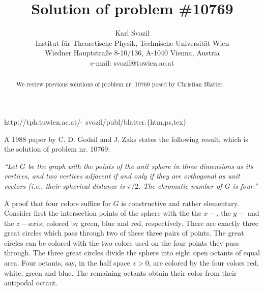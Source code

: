 

\def\frak{\cal }
\def\Bbb{\bf }

\title{Solution of problem \#10769}
\author{Karl Svozil\\
 {\small Institut f\"ur Theoretische Physik,}
  {\small Technische Universit\"at Wien }     \\
  {\small Wiedner Hauptstra\ss e 8-10/136,}
  {\small A-1040 Vienna, Austria   }            \\
  {\small e-mail: svozil@tuwien.ac.at}}
\date{ }
\maketitle

\begin{flushright}
{\scriptsize
http://tph.tuwien.ac.at/$\widetilde{\;\;}\,$svozil/publ/blatter.$\{$htm,ps,tex$\}$}
\end{flushright}

\begin{abstract}
We review previous solutions of problem nr. 10769 posed by Christian Blatter
\end{abstract}

A 1988 paper by C. D. Godsil and J. Zaks \cite{godsil-zaks} states the following result, which is
the solution of problem nr. 10769:

{\em ``Let $G$ be the graph with the points of the unit sphere in three dimensions
as its vertices, and two vertices adjacent if and only if they are orthogonal as unit vectors
(i.e., their spherical distance is $\pi /2$.
The chromatic number of $G$ is four.''}

A proof that four colors suffice for $G$ is constructive and rather elementary.
Consider first the intersection points of the
sphere with the the $x-$, the $y-$ and the $z-axis$,
colored by green, blue and red, respectively.
There are exactly three great circles which pass through two of these three pairs of points.
The great circles can be colored with the two colors used on the four points they pass through.
The three great circles divide the sphere into eight open octants
of equal area. Four octants, say, in the half space $z>0$, are colored by the four colors
red, white, green and blue. The remaining octants
obtain their color from their antipodal octant.

